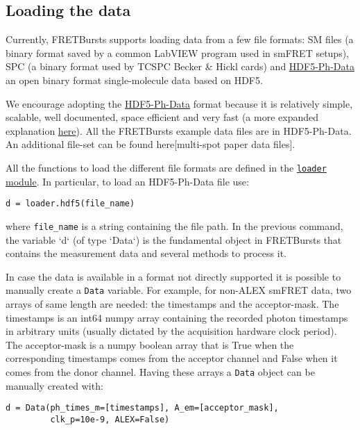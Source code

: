 \subsection{Loading the data}
Currently, FRETBursts supports loading data from a few file formats: SM files (a binary format saved by a common LabVIEW program used in smFRET setups), SPC (a binary format used by TCSPC Becker \& Hickl cards) and \href{https://github.com/tritemio/FRETBursts/wiki/HDF5-Ph-Data-format-0.2-Draft}{HDF5-Ph-Data}  an open binary format single-molecule data based on HDF5.

We encourage adopting the \href{https://github.com/tritemio/FRETBursts/wiki/HDF5-Ph-Data-format-0.2-Draft}{HDF5-Ph-Data} format because it is relatively simple, scalable, well documented, space efficient and very fast (a more expanded explanation \href{http://fretbursts.readthedocs.org/en/latest/HDF5_format.html}{here}). All the FRETBursts example data files are in HDF5-Ph-Data. An additional file-set can be found here[multi-spot paper data files].

All the functions to load the different file formats are defined in the \href{http://fretbursts.readthedocs.org/en/latest/loader.html}{\texttt{loader} module}. In particular, to load an HDF5-Ph-Data file use:

\begin{verbatim}
d = loader.hdf5(file_name)
\end{verbatim}

where \verb|file_name| is a string containing the file path. In the previous command, the variable `d` (of type `Data`) is the fundamental object in FRETBursts that contains the measurement data and several methods to process it.

In case the data is available in a format not directly supported it is possible to manually create a \verb|Data| variable. For example, for non-ALEX smFRET data, two arrays of same length are needed: the timestamps and the acceptor-mask. The timestamps is an int64 numpy array containing the recorded photon timestamps in arbitrary units (usually dictated by the acquisition hardware clock period). The acceptor-mask is a numpy boolean array that is True when the corresponding timestamps comes from the acceptor channel and False when it comes from the donor channel. Having these arrays a \verb|Data| object can be manually created with:

\begin{verbatim}
d = Data(ph_times_m=[timestamps], A_em=[acceptor_mask], 
         clk_p=10e-9, ALEX=False)
\end{verbatim}

